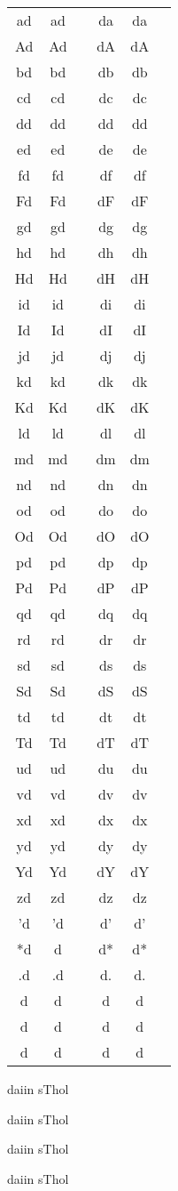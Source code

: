 \documentclass{article}
\def\y#1{#1 & {\eva #1} &\frame{\eva #1}}
\def\x#1#2{\y{#1#2}&\y{#2#1}\\}
\def\test#1{
\noindent
\begin{tabular}{ccc|ccc}
\x{a}{#1}
\x{A}{#1}
\x{b}{#1}
\x{c}{#1}
\x{d}{#1}
\x{e}{#1}
\x{f}{#1}
\x{F}{#1}
\x{g}{#1}
\x{h}{#1}
\x{H}{#1}
\x{i}{#1}
\x{I}{#1}
\x{j}{#1}
\x{k}{#1}
\x{K}{#1}
\x{l}{#1}
\x{m}{#1}
\x{n}{#1}
\x{o}{#1}
\x{O}{#1}
\x{p}{#1}
\x{P}{#1}
\x{q}{#1}
\x{r}{#1}
\x{s}{#1}
\x{S}{#1}
\x{t}{#1}
\x{T}{#1}
\x{u}{#1}
\x{v}{#1}
\x{x}{#1}
\x{y}{#1}
\x{Y}{#1}
\x{z}{#1}
\x{'}{#1}
\x{*}{#1}
\x{.}{#1}
\x{\revs}{#1}
\x{\doodleA}{#1}
\x{\doodleB}{#1}
\end{tabular}
}
\begin{document}
\test{d}

{\evasmall daiin sThol}

{\eva daiin sThol}

{\evalarge daiin sThol}

{\evaLarge daiin sThol}
\end{document}
